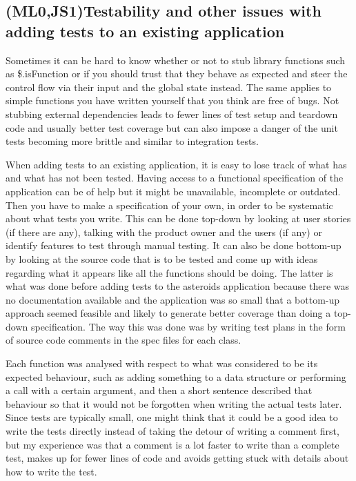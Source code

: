 \documentclass[11pt]{article}
\begin{document}
\subsection{(ML0,JS1)Testability and other issues with adding tests to an existing application}

Sometimes it can be hard to know whether or not to stub library functions such as \$.isFunction or if you should trust that they behave as expected and steer the control flow via their input and the global state instead. The same applies to simple functions you have written yourself that you think are free of bugs. Not stubbing external dependencies leads to fewer lines of test setup and teardown code and usually better test coverage but can also impose a danger of the unit tests becoming more brittle and similar to integration tests.

When adding tests to an existing application, it is easy to lose track of what has and what has not been tested. Having access to a functional specification of the application can be of help but it might be unavailable, incomplete or outdated. Then you have to make a specification of your own, in order to be systematic about what tests you write. This can be done top-down by looking at user stories (if there are any), talking with the product owner and the users (if any) or identify features to test through manual testing. It can also be done bottom-up by looking at the source code that is to be tested and come up with ideas regarding what it appears like all the functions should be doing. The latter is what was done before adding tests to the asteroids application because there was no documentation available and the application was so small that a bottom-up approach seemed feasible and likely to generate better coverage than doing a top-down specification. The way this was done was by writing test plans in the form of source code comments in the \gls{spec} files for each class.

Each function was analysed with respect to what was considered to be its expected behaviour, such as adding something to a data structure or performing a call with a certain argument, and then a short sentence described that behaviour so that it would not be forgotten when writing the actual tests later. Since tests are typically small, one might think that it could be a good idea to write the tests directly instead of taking the detour of writing a comment first, but my experience was that a comment is a lot faster to write than a complete test, makes up for fewer lines of code and avoids getting stuck with details about how to write the test.
\end{document}
